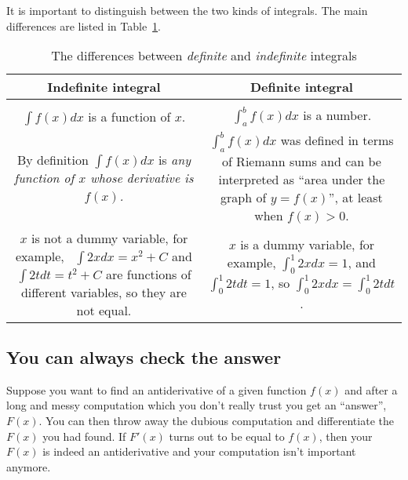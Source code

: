 It is important to distinguish between the two kinds of integrals.
The main differences are listed in
Table~\ref{tbl:def-vs-indef-integrals}.

\begin{table}\sffamily
  \begin{tabular}{@{\extracolsep{2em}}cc}
    \toprule[2pt]
    \bfseries Indefinite integral & \bfseries Definite integral\\[2pt]
    \midrule \\
    $\int f(x) d x$ is a function of $x$.&
    $\int_a^bf(x)d x$ is a number. \\[1ex]
    \begin{minipage}[c]{160pt}
      By definition $\int f(x)d x$ is \textit{any function of $x$
        whose derivative is $f (x)$.}
    \end{minipage} &
    \begin{minipage}[c]{160pt}
      $\int_a^b f(x)d x$ was defined in terms of Riemann sums and can be
      interpreted as ``area under the graph of $y=f(x)$'', at least when
      $f(x)>0$.
    \end{minipage}
    \\[1ex]
    \parbox[t]{160pt}{\vspace{1pt}

      $x$ is not a dummy variable, for example, 
      \ $\int 2xd x=x^2+C$ and $\int 2td t=t^2+C$ are
      functions of different variables, 
      so they are not equal.}&
    \parbox[t]{160pt}{\vspace{1pt}

      $x$ is a dummy variable, for example,  
      $\int_0^1 2xd x=1$, and $\int_0^1 2td t=1$, 
      so $\int_0^1 2xd x=\int_0^1 2td t$.}\\
    \bottomrule[2pt]

  \end{tabular}
  \bigskip
  
  \caption{The differences between \emph{definite} and
  \emph{indefinite} integrals}
  \label{tbl:def-vs-indef-integrals}
\end{table}


\subsection{You can always check the answer}
\label{sec:you-can-always}
Suppose you want to find an antiderivative of a given function $f(x)$
and after a long and messy computation which you don't really trust
you get an ``answer'', $F(x)$. You can then throw away the dubious
computation and differentiate the $F(x)$ you had found. If $F'(x)$
turns out to be equal to $f(x)$, then your $F(x)$ is indeed an
antiderivative and your computation isn't important anymore.

